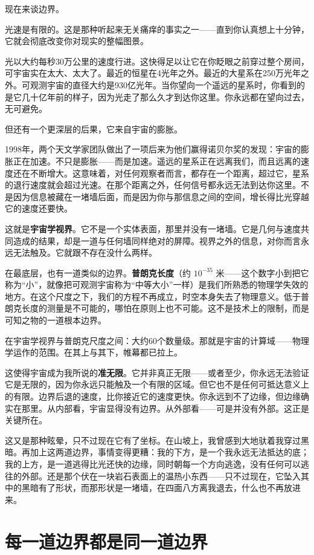 \documentclass[11pt, twoside, openright]{book}
\begin{document}
现在来谈边界。

光速是有限的。这是那种听起来无关痛痒的事实之一------直到你认真想上十分钟，它就会彻底改变你对现实的整幅图景。

光以大约每秒30万公里的速度行进。这快得足以让它在你眨眼之前穿过整个房间，可宇宙实在太大、太大了。最近的恒星在4光年之外。最近的大星系在250万光年之外。可观测宇宙的直径大约是930亿光年。当你望向一个遥远的星系时，你看到的是它几十亿年前的样子，因为光走了那么久才到达你这里。你永远都在望向过去，无可避免。

但还有一个更深层的后果，它来自宇宙的膨胀。

1998年，两个天文学家团队做出了一项后来为他们赢得诺贝尔奖的发现：宇宙的膨胀正在加速。不只是膨胀------而是加速。遥远的星系正在远离我们，而且远离的速度还在不断增大。这意味着，对任何观察者而言，都存在一个距离，超过它，星系的退行速度就会超过光速。在那个距离之外，任何信号都永远无法到达你这里。不是因为信息被藏在一堵墙后面，而是因为你与那信息之间的空间，增长得比光穿越它的速度还要快。

这就是\textbf{宇宙学视界}。它不是一个实体表面，那里并没有一堵墙。它是几何与速度共同造成的结果，却是一道与任何墙同样绝对的屏障。视界之外的信息，对你而言永远无法触及。它就跟不存在没什么两样。

在最底层，也有一道类似的边界。\textbf{普朗克长度}（约 $10^{-35}$ 米------这个数字小到把它称为“小”，就像把可观测宇宙称为“中等大小”一样）是我们所熟悉的物理学失效的地方。在这个尺度之下，我们的方程不再成立，时空本身失去了物理意义。低于普朗克长度的测量是不可能的，哪怕在原则上也不可能。这不是技术上的限制，而是可知之物的一道根本边界。

在宇宙学视界与普朗克尺度之间：大约60个数量级。那就是宇宙的计算域------物理学运作的范围。在其上与其下，帷幕都已拉上。

这使得宇宙成为我所说的\textbf{准无限}。它并非真正无限------或者至少，你永远无法验证它是无限的，因为你永远只能触及一个有限的区域。但它也不是任何可抵达意义上的有限。边界后退的速度，比你接近它的速度更快。你永远到不了边缘，但边缘确实在那里。从内部看，宇宙显得没有边界。从外部看------可是并没有外部。这正是关键所在。

这又是那种眩晕，只不过现在它有了坐标。在山坡上，我曾感到大地驮着我穿过黑暗。再加上这两道边界，事情变得更糟：我的下方，是一个我永远无法抵达的底；我的上方，是一道逃得比光还快的边缘，同时朝每一个方向逃逸，没有任何可以逃往的外部。还是那个伏在一块岩石表面上的温热小东西------只不过现在，它坠入其中的黑暗有了形状，而那形状是一堵墙，在四面八方离我退去，什么也不再放进来。


\section*{每一道边界都是同一道边界}
\end{document}
